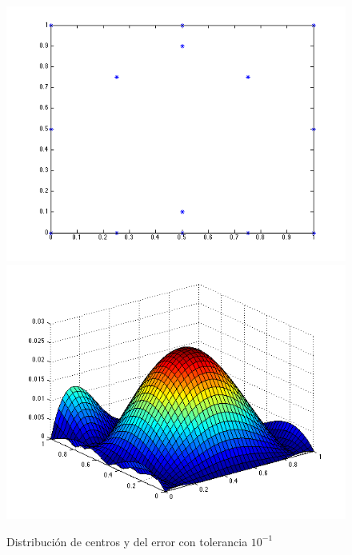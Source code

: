 \documentclass[11pt,a4paper]{article}
\begin{document}
\begin{figure}[H]
\begin{center}
\includegraphics[scale=.4]{edp1_tol1.png}
\includegraphics[scale=.4]{error_edp1_tol1.png}
\caption{Distribución de centros y del error con tolerancia $10^{-1}$}
\end{center}
\end{figure}
\end{document}
